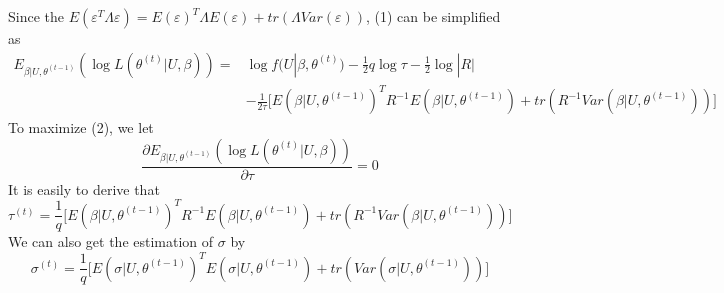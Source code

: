 \documentclass[12pt]{article}
\begin{document}
     Since the $E(\varepsilon^T\Lambda\varepsilon)=E(\varepsilon)^T\Lambda E(\varepsilon)+tr(\Lambda Var(\varepsilon))$, (1) can be simplified as 
    \begin{equation}
    \begin{split}
        E_{\beta|U,\theta^{(t-1)}}(\log L(\theta^{(t)}|U,\beta))=&\log f(U|\beta,\theta^{(t)})-\frac{1}{2} q\log\tau-\frac{1}{2}\log|R|\\
        &-\frac{1}{2\tau}\Big[E(\beta|U,\theta^{(t-1)})^TR^{-1} E(\beta|U,\theta^{(t-1)})+tr(R^{-1} Var(\beta|U,\theta^{(t-1)}))\Big]
    \end{split}
    \end{equation}   
    To maximize (2), we let
    \begin{equation*}
    \frac{\partial E_{\beta|U,\theta^{(t-1)}}(\log L(\theta^{(t)}|U,\beta))}{\partial \tau}=0
    \end{equation*}  
    It is easily to derive that 
    \begin{equation}
        \tau^{(t)}=\frac{1}{q}\Big[E(\beta|U,\theta^{(t-1)})^TR^{-1} E(\beta|U,\theta^{(t-1)})+tr(R^{-1} Var(\beta|U,\theta^{(t-1)}))\Big]
    \end{equation}
    We can also get the estimation of $\sigma$ by
    \begin{equation}
        \sigma^{(t)}=\frac{1}{q}\Big[E(\sigma|U,\theta^{(t-1)})^TE(\sigma|U,\theta^{(t-1)})+tr( Var(\sigma|U,\theta^{(t-1)}))\Big]
    \end{equation}    
\end{document}
